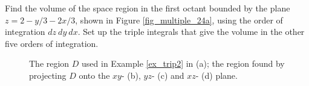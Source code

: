 \begin{example}
\label{ex_trip2}
Find the volume of the space region in the first octant bounded by the plane $z=2-y/3-2x/3$, shown in Figure \ref{fig_multiple_24a}, using the order of integration $dz\ dy\ dx$. Set up the triple integrals that give the volume in the other five orders of integration.
\begin{figure}[H]
\centering
\centerline{
\qquad
{}}

\centerline{
\qquad
{}}
\caption{The region $D$ used in Example \ref{ex_trip2} in (a); the region found by projecting $D$ onto the $xy$- (b), $yz$- (c) and $xz$- (d) plane.}
\end{figure}


\end{example}
